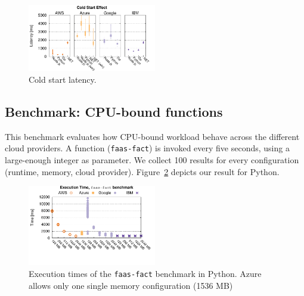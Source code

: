 \begin{figure}[!t]
\centering
\includegraphics[width=0.5\textwidth]{bilder/cold_start/coldstart_whisker.pdf}
\caption{Cold start latency.}
\label{fig:coldstart_plot}
\end{figure}



\subsection{Benchmark: CPU-bound functions}
\label{sec:general_test}
This benchmark evaluates how CPU-bound workload behave across the different cloud providers.
A function (\texttt{faas-fact}) is invoked every five seconds, using a large-enough integer as parameter. 
We collect 100 results for every configuration (runtime, memory, cloud provider).
Figure~\ref{fig:general_python_plot} depicts our result for Python.

\begin{figure}[!t]
\centering
\includegraphics[width=0.5\textwidth, trim={0 40 0 0}]{bilder/general_python/cpufact.pdf}
\caption{Execution times of the \texttt{faas-fact} benchmark in Python. Azure allows only one single memory configuration (1536 MB)}
\label{fig:general_python_plot}

\end{figure}

